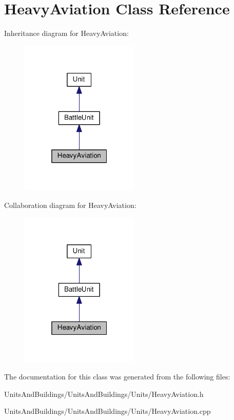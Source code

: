 \hypertarget{class_heavy_aviation}{}\section{Heavy\+Aviation Class Reference}
\label{class_heavy_aviation}


Inheritance diagram for Heavy\+Aviation\+:
\nopagebreak
\begin{figure}[H]
\begin{center}
\leavevmode
\includegraphics[width=160pt]{class_heavy_aviation__inherit__graph}
\end{center}
\end{figure}


Collaboration diagram for Heavy\+Aviation\+:
\nopagebreak
\begin{figure}[H]
\begin{center}
\leavevmode
\includegraphics[width=160pt]{class_heavy_aviation__coll__graph}
\end{center}
\end{figure}


The documentation for this class was generated from the following files\+:\begin{DoxyCompactItemize}
\item 
Units\+And\+Buildings/\+Units\+And\+Buildings/\+Units/Heavy\+Aviation.\+h\item 
Units\+And\+Buildings/\+Units\+And\+Buildings/\+Units/Heavy\+Aviation.\+cpp\end{DoxyCompactItemize}

